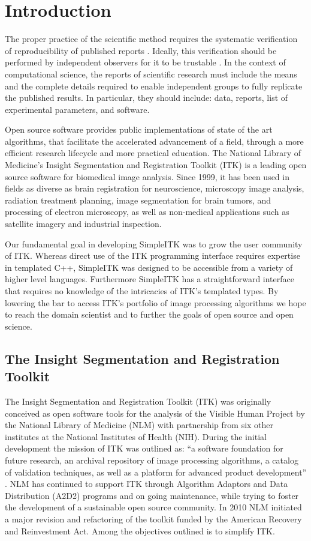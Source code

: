 \documentclass{frontiersMED} %
\begin{document}
\section{Introduction}
The proper practice of the scientific method requires the systematic
verification of reproducibility of published reports
\cite{Popper1934}. Ideally, this verification should be performed by
independent observers for it to be trustable \cite{Popper1968}. In
the context of computational science, the reports of scientific
research must include the means and the complete details required to
enable independent groups to fully replicate the published results.
In particular, they should include: data, reports,
list of experimental parameters, and software.

Open source software provides public implementations of state of the
art algorithms, that facilitate the accelerated advancement of a
field, through a more efficient research lifecycle and more
practical education. The National Library of Medicine's Insight
Segmentation and Registration Toolkit (ITK) is a leading open source
software for biomedical image analysis. Since 1999, it has been used
in fields as diverse as brain registration for neuroscience, microscopy
image analysis, radiation treatment planning, image segmentation for
brain tumors, and processing of electron microscopy, as well as
non-medical applications such as satellite imagery and industrial
inspection.

Our fundamental goal in developing SimpleITK was to grow the user community
of ITK.  Whereas direct use of the ITK programming interface requires
expertise in templated C++, SimpleITK was designed to be accessible
from a variety of higher level languages.  Furthermore SimpleITK has a
straightforward interface that requires no knowledge of the
intricacies of ITK's templated types. By lowering the bar to access
ITK's portfolio of image processing algorithms we hope to reach the domain
scientist and to further the goals of open source and open science.

\subsection{The Insight Segmentation and Registration Toolkit}

The Insight Segmentation and Registration Toolkit (ITK) was originally
conceived as open software tools for the analysis of the Visible
Human Project by the National Library of Medicine (NLM) with
partnership from six other institutes at the National Institutes of
Health (NIH). During the initial development the mission of ITK was
outlined as: “a software foundation for future research, an archival
repository of image processing algorithms, a catalog of validation
techniques, as well as a platform for advanced product development”
\cite{Yoo2002}. NLM has continued to support ITK through Algorithm Adaptors
and Data Distribution (A2D2) programs and on going maintenance, while
trying to foster the development of a sustainable open source
community. In 2010 NLM initiated a major revision and refactoring of
the toolkit funded by the American Recovery and Reinvestment
Act. Among the objectives outlined is to simplify ITK.
\end{document}
